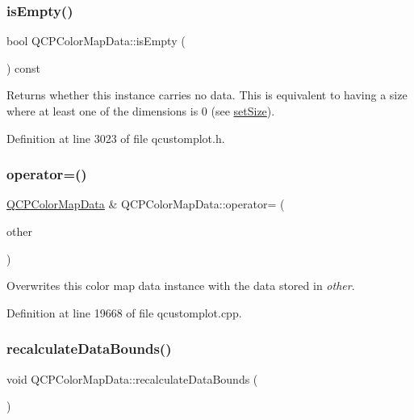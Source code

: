 \subsubsection{\texorpdfstring{is\+Empty()}{isEmpty()}}
{\footnotesize\ttfamily bool Q\+C\+P\+Color\+Map\+Data\+::is\+Empty (\begin{DoxyParamCaption}{ }\end{DoxyParamCaption}) const\hspace{0.3cm}{\ttfamily [inline]}}

Returns whether this instance carries no data. This is equivalent to having a size where at least one of the dimensions is 0 (see \hyperlink{class_q_c_p_color_map_data_a0d9ff35c299d0478b682bfbcdd9c097e}{set\+Size}). 

Definition at line 3023 of file qcustomplot.\+h.

\mbox{\label{class_q_c_p_color_map_data_afdf4dd1b2f5714234fe84709b85c2a8d}} 
\subsubsection{\texorpdfstring{operator=()}{operator=()}}
{\footnotesize\ttfamily \hyperlink{class_q_c_p_color_map_data}{Q\+C\+P\+Color\+Map\+Data} \& Q\+C\+P\+Color\+Map\+Data\+::operator= (\begin{DoxyParamCaption}\item[{const \hyperlink{class_q_c_p_color_map_data}{Q\+C\+P\+Color\+Map\+Data} \&}]{other }\end{DoxyParamCaption})}

Overwrites this color map data instance with the data stored in {\itshape other}. 

Definition at line 19668 of file qcustomplot.\+cpp.

\mbox{\label{class_q_c_p_color_map_data_ab235ade8a4d64bd3adb26a99b3dd57ee}} 
\subsubsection{\texorpdfstring{recalculate\+Data\+Bounds()}{recalculateDataBounds()}}
{\footnotesize\ttfamily void Q\+C\+P\+Color\+Map\+Data\+::recalculate\+Data\+Bounds (\begin{DoxyParamCaption}{ }\end{DoxyParamCaption})}

